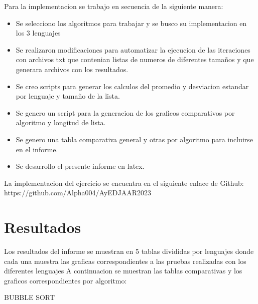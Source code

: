 \documentclass[12pt]{article} %
\begin{document}
Para la implementacion se trabajo en secuencia de la siguiente manera:
\begin{itemize}
    \item Se selecciono los algoritmos para trabajar y se busco su implementacion en los 3 lenguajes
    \item Se realizaron modificaciones para automatizar la ejecucion de las iteraciones con archivos txt que contenian listas de numeros de diferentes tamaños y que generara archivos con los resultados.
    \item Se creo scripts para generar los calculos del promedio y desviacion estandar por lenguaje y tamaño de la lista.
    \item Se genero un script para la generacion de los graficos comparativos por algoritmo y longitud de lista.
    \item Se genero una tabla comparativa general y otras por algoritmo para incluirse en el informe.
    \item Se desarrollo el presente informe en latex.
\end{itemize}

La implementacion del ejercicio se encuentra en el siguiente enlace de Github: https://github.com/Alpha004/AyEDJAAR2023
\section{Resultados}

Los resultados del informe se muestran en 5 tablas divididas por lenguajes donde cada una muestra las graficas correspondientes a las pruebas realizadas con los diferentes lenguajes
A continuacion se muestran las tablas comparativas y los graficos correspondientes por algoritmo:

\vspace{15cm}

BUBBLE SORT

\vspace{5mm}
\end{document}
